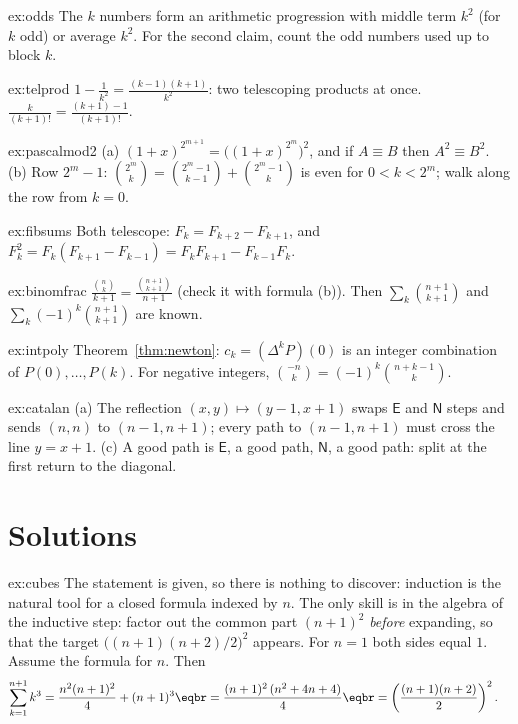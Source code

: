 \begin{hint}{ex:odds}
The $k$ numbers form an arithmetic progression with middle term $k^2$ (for $k$ odd) or average $k^2$. For the second claim, count the odd numbers used up to block $k$.
\end{hint}
\begin{hint}{ex:telprod}
$1-\frac1{k^2}=\frac{(k-1)(k+1)}{k^2}$: two telescoping products at once. $\frac k{(k+1)!}=\frac{(k+1)-1}{(k+1)!}$.
\end{hint}
\begin{hint}{ex:pascalmod2}
(a) $(1+x)^{2^{m+1}}=\bigl((1+x)^{2^m}\bigr)^2$, and if $A\equiv B$ then $A^2\equiv B^2$. (b) Row $2^m-1$: $\binom{2^m}k=\binom{2^m-1}{k-1}+\binom{2^m-1}k$ is even for $0<k<2^m$; walk along the row from $k=0$.
\end{hint}
\begin{hint}{ex:fibsums}
Both telescope: $F_k=F_{k+2}-F_{k+1}$, and $F_k^2=F_k(F_{k+1}-F_{k-1})=F_kF_{k+1}-F_{k-1}F_k$.
\end{hint}
\begin{hint}{ex:binomfrac}
$\frac{\binom nk}{k+1}=\frac{\binom{n+1}{k+1}}{n+1}$ (check it with formula (b)). Then $\sum_k\binom{n+1}{k+1}$ and $\sum_k(-1)^k\binom{n+1}{k+1}$ are known.
\end{hint}
\begin{hint}{ex:intpoly}
Theorem~\ref{thm:newton}: $c_k=(\Delta^kP)(0)$ is an integer combination of $P(0),\dots,P(k)$. For negative integers, $\binom{-n}k=(-1)^k\binom{n+k-1}k$.
\end{hint}
\begin{hint}{ex:catalan}
(a) The reflection $(x,y)\mapsto(y-1,x+1)$ swaps $\mathsf E$ and $\mathsf N$ steps and sends $(n,n)$ to $(n-1,n+1)$; every path to $(n-1,n+1)$ must cross the line $y=x+1$. (c) A good path is $\mathsf E$, a good path, $\mathsf N$, a good path: split at the first return to the diagonal.
\end{hint}

\section{Solutions}

\begin{solution}{ex:cubes}
\idea The statement is given, so there is nothing to discover: induction is the natural tool for a closed formula indexed by $n$. The only skill is in the algebra of the inductive step: factor out the common part $(n+1)^2$ \emph{before} expanding, so that the target $\bigl((n+1)(n+2)/2\bigr)^2$ appears.
\writeup For $n=1$ both sides equal $1$. Assume the formula for $n$. Then
\[
\begin{aligned}\sum_{k=1}^{n+1}k^3&=\frac{n^2(n+1)^2}4+(n+1)^3\eqbr=\frac{(n+1)^2\,(n^2+4n+4)}4\eqbr=\left(\frac{(n+1)(n+2)}2\right)^2.\end{aligned}
\]
\end{solution}

